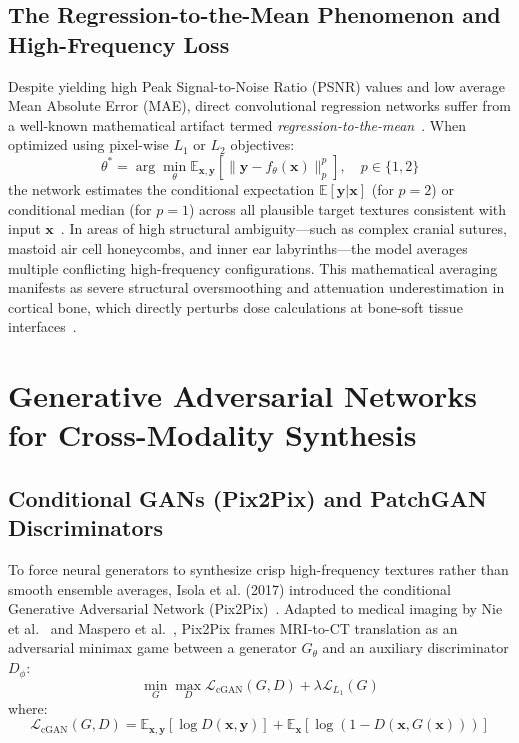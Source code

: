 \subsection{The Regression-to-the-Mean Phenomenon and High-Frequency Loss}
Despite yielding high Peak Signal-to-Noise Ratio (PSNR) values and low average Mean Absolute Error (MAE), direct convolutional regression networks suffer from a well-known mathematical artifact termed \emph{regression-to-the-mean}~\cite{isola2017image,saharia2022palette}. When optimized using pixel-wise $L_1$ or $L_2$ objectives:
\begin{equation}
\theta^* = \arg\min_\theta \mathbb{E}_{\mathbf{x}, \mathbf{y}} \left[ \|\mathbf{y} - f_\theta(\mathbf{x})\|_p^p \right], \quad p \in \{1, 2\}
\label{eq:pixel_loss}
\end{equation}
the network estimates the conditional expectation $\mathbb{E}[\mathbf{y} | \mathbf{x}]$ (for $p=2$) or conditional median (for $p=1$) across all plausible target textures consistent with input $\mathbf{x}$~\cite{isola2017image}. In areas of high structural ambiguity—such as complex cranial sutures, mastoid air cell honeycombs, and inner ear labyrinths—the model averages multiple conflicting high-frequency configurations. This mathematical averaging manifests as severe structural oversmoothing and attenuation underestimation in cortical bone, which directly perturbs dose calculations at bone-soft tissue interfaces~\cite{edmund2017review}.

\section{Generative Adversarial Networks for Cross-Modality Synthesis}

\subsection{Conditional GANs (Pix2Pix) and PatchGAN Discriminators}
To force neural generators to synthesize crisp high-frequency textures rather than smooth ensemble averages, Isola et al. (2017) introduced the conditional Generative Adversarial Network (Pix2Pix)~\cite{isola2017image}. Adapted to medical imaging by Nie et al.~\cite{nie2017medical} and Maspero et al.~\cite{maspero2018dose}, Pix2Pix frames MRI-to-CT translation as an adversarial minimax game between a generator $G_\theta$ and an auxiliary discriminator $D_\phi$:
\begin{equation}
\min_G \max_D \mathcal{L}_{\text{cGAN}}(G, D) + \lambda \mathcal{L}_{L_1}(G)
\label{eq:pix2pix_game}
\end{equation}
where:
\begin{equation}
\mathcal{L}_{\text{cGAN}}(G, D) = \mathbb{E}_{\mathbf{x}, \mathbf{y}} \left[ \log D(\mathbf{x}, \mathbf{y}) \right] + \mathbb{E}_{\mathbf{x}} \left[ \log \left( 1 - D(\mathbf{x}, G(\mathbf{x})) \right) \right]
\label{eq:cgan_objective}
\end{equation}

